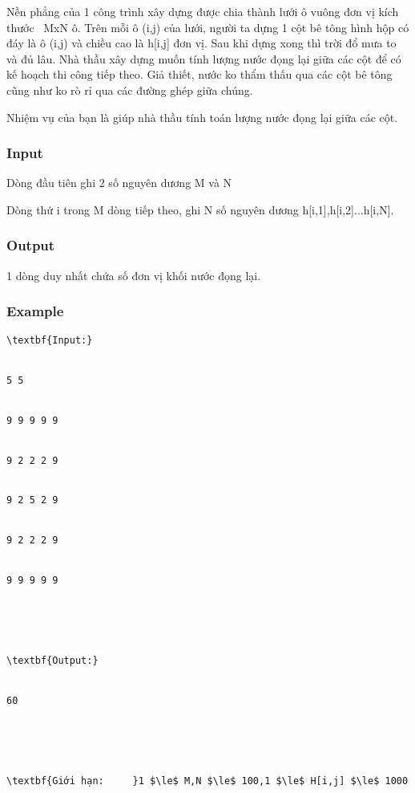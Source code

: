 



   Nền phẳng của 1 công trình xây dựng được chia thành lưới ô vuông đơn vị kích thước  MxN ô. Trên mỗi ô (i,j) của lưới, người ta dựng 1 cột bê tông hình hộp có đáy là ô (i,j) và chiều cao là h[i,j] đơn vị. Sau khi dựng xong thì trời đổ mưa to và đủ lâu. Nhà thầu xây dựng muốn tính lượng nước đọng lại giữa các cột để có kế hoạch thi công tiếp theo. Giả thiết, nước ko thẩm thấu qua các cột bê tông cũng như ko rò rỉ qua các đường ghép giữa chúng.  

   Nhiệm vụ của bạn là giúp nhà thầu tính toán lượng nước đọng lại giữa các cột.  

\subsubsection{   Input  }

   Dòng đầu tiên ghi 2 số nguyên dương M và N  

   Dòng thứ i trong M dòng tiếp theo, ghi N số nguyên dương h[i,1],h[i,2]...h[i,N].  

\subsubsection{   Output  }

   1 dòng duy nhất chứa số đơn vị khối nước đọng lại.  



\subsubsection{   Example  }
\begin{verbatim}
\textbf{Input:}


5 5


9 9 9 9 9


9 2 2 2 9


9 2 5 2 9


9 2 2 2 9


9 9 9 9 9





\textbf{Output:}


60





\textbf{Giới hạn:     }1 $\le$ M,N $\le$ 100,1 $\le$ H[i,j] $\le$ 1000


\end{verbatim}
